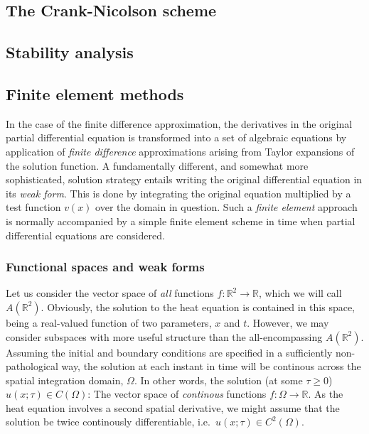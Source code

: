 \documentclass[a4paper, twocolumn]{article}
\begin{document}
\subsection{The Crank-Nicolson scheme}
\lipsum[3]

\subsection{Stability analysis \label{sect:finitestability}}
\lipsum[4]


\subsection{Finite element methods}
In the case of the finite difference approximation, the derivatives in the original partial differential equation is transformed into a set of algebraic equations by application of \textit{finite difference} approximations arising from Taylor expansions of the solution function. A fundamentally different, and somewhat more sophisticated, solution strategy entails writing the original differential equation in its \textit{weak form}. This is done by integrating the original equation multiplied by a test function $v(x)$ over the domain in question. Such a \textit{finite element} approach is normally accompanied by a simple finite element scheme in time when partial differential equations are considered. 

\subsubsection{Functional spaces and weak forms}
Let us consider the vector space of \textit{all} functions $f:\mathds{R}^2\rightarrow\mathds{R}$, which we will call $A(\mathds{R}^2)$. Obviously, the solution to the heat equation is contained in this space, being a real-valued function of two parameters, $x$ and $t$. However, we may consider subspaces with more useful structure than the all-encompassing $A(\mathds{R}^2)$. Assuming the initial and boundary conditions are specified in a sufficiently non-pathological way, the solution at each instant in time will be continous across the spatial integration domain, $\Omega$. In other words, the solution (at some $\tau\ge0$) $u(x;\tau)\in C(\Omega)$: The vector space of \textit{continous} functions $f:\Omega\rightarrow\mathds{R}$. As the heat equation involves a second spatial derivative, we might assume that the solution be twice continously differentiable, i.e.\ $u(x;\tau)\in C^2(\Omega)$.
\end{document}
